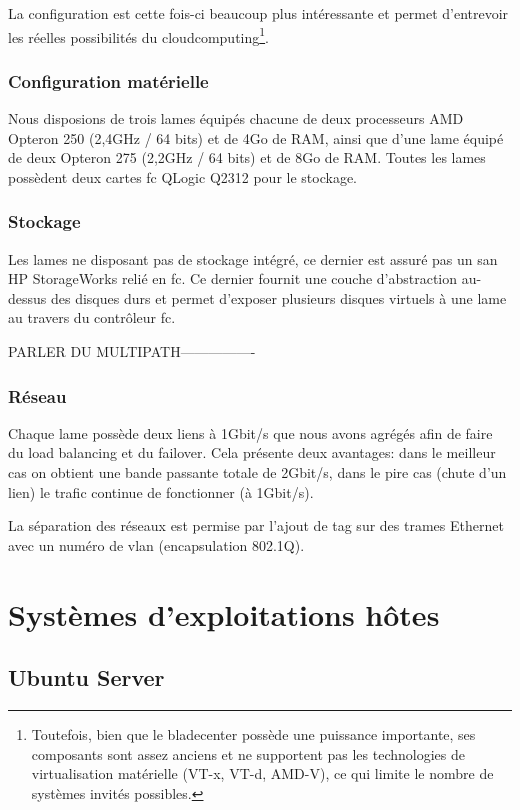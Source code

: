 \documentclass[a4paper,oneside]{report}
\begin{document}
La configuration est cette fois-ci beaucoup plus intéressante et permet d'entrevoir les réelles possibilités du \gls{cloudcomputing}\footnote{Toutefois, bien que le \gls{bladecenter} possède une puissance importante, ses composants sont assez anciens et ne supportent pas les technologies de \gls{virtualisation} matérielle (VT-x, VT-d, AMD-V), ce qui limite le nombre de systèmes invités possibles.}.

\subsection{Configuration matérielle}
Nous disposions de trois lames équipés chacune de deux processeurs AMD Opteron 250 (2,4GHz / 64 bits) et de 4Go de RAM, ainsi que d'une lame équipé de deux Opteron 275 (2,2GHz / 64 bits) et de 8Go de RAM.\newline
Toutes les lames possèdent deux cartes \gls{fc} QLogic Q2312 pour le stockage.

\subsection{Stockage}
Les lames ne disposant pas de stockage intégré, ce dernier est assuré pas un \gls{san} HP StorageWorks relié en \gls{fc}.
Ce dernier fournit une couche d'abstraction au-dessus des disques durs et permet d'exposer plusieurs disques \og virtuels \fg à une lame au travers du contrôleur \gls{fc}.

PARLER DU MULTIPATH----------------

\subsection{Réseau}
Chaque lame possède deux liens à 1Gbit/s que nous avons agrégés afin de faire du \gls{load balancing} et du \gls{failover}. Cela présente deux avantages: dans le meilleur cas on obtient une bande passante totale de 2Gbit/s, dans le pire cas (chute d'un lien) le trafic continue de fonctionner (à 1Gbit/s).

La séparation des réseaux est permise par l'ajout de tag sur des trames Ethernet avec un numéro de \gls{vlan} (encapsulation 802.1Q).


\chapter{Systèmes d'exploitations hôtes}
\section{Ubuntu Server} \label{cha:ubuntu}
\end{document}
